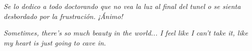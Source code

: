 
\begin{dedication} %

\textit{
Se lo dedico a todo doctorando que no vea la luz al final del tunel o se sienta desbordado por la frustración. ¡Ánimo!
}


\emph{Sometimes, there's so much beauty in the world... I feel like I can't take it, like my heart is just going to cave in.}

\end{dedication}

